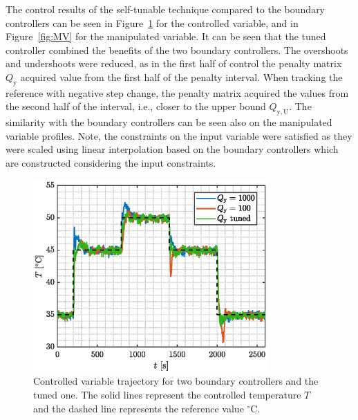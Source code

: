 \documentclass[preprint,12pt]{elsarticle}
\begin{document}
	The control results of the self-tunable technique compared to the boundary controllers can be seen in Figure~\ref{fig:CV} for the controlled variable, and in Figure~\ref{fig:MV} for the manipulated variable. It can be seen that the tuned controller combined the benefits of the two boundary controllers. The overshoots and undershoots were reduced, as in the first half of control the penalty matrix $Q_\mathrm{y}$ acquired value from the first half of the penalty interval. When tracking the reference with negative step change, the penalty matrix acquired the values from the second half of the interval, i.e., closer to the upper bound $Q_\mathrm{y, U}$. 
	The similarity with the boundary controllers can be seen also on the manipulated variable profiles. Note, the constraints on the input variable were satisfied as they were scaled using linear interpolation based on the boundary controllers which are constructed considering the input constraints. 
	
	\begin{figure}
		\begin{center}
			\includegraphics[width=0.8\textwidth]{images/CV}
			\caption{Controlled variable trajectory for two boundary controllers and the tuned one. The solid lines represent the controlled temperature $T$ and the dashed line represents the reference value $^{\circ}\mathrm{C}$.}
			\label{fig:CV}
		\end{center}
	\end{figure}
	
\end{document}

